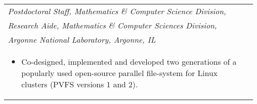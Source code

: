 \documentclass{article}
\begin{document}
\begin{center}
	\normalsize
	\begin{tabularx}{6.2in}{Xr}
	\emph{Postdoctoral Staff, Mathematics \& Computer Science Division,} \\
	\emph{Research Aide, Mathematics \& Computer Sciences Division,} 	\\
	\emph{Argonne National Laboratory, Argonne, IL}  \\
	\begin{itemize}
	\small
        \item {Co-designed, implemented and developed two generations of a popularly used open-source parallel file-system
           for Linux clusters (PVFS versions 1 and 2).}
	\end{itemize}
	\end{tabularx}

  \end{center}
\end{document}
